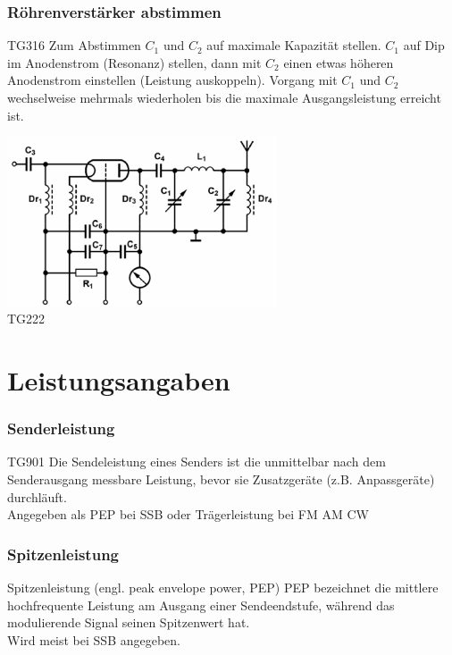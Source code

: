 \begin{frame}
    \frametitle{Röhrenverstärker abstimmen}
    \begin{center} \Large
        \begin{block}{TG316}
		\large
		Zum Abstimmen $C_1$ und $C_2$ auf maximale Kapazität stellen. $C_1$ auf Dip im Anodenstrom (Resonanz) stellen, dann mit $C_2$ einen etwas höheren Anodenstrom einstellen (Leistung auskoppeln). Vorgang mit $C_1$ und $C_2$ wechselweise mehrmals wiederholen bis die maximale Ausgangsleistung erreicht ist.
    	\end{block}
        \includegraphics[width=0.6\textwidth]{a07/TG313.png}\\
        \tiny TG222 \hyperlink{refs}{\cite{bna}}
    \end{center}
\end{frame}

\section*{Leistungsangaben}

\begin{frame}
    \frametitle{Senderleistung}
        \begin{block}{TG901} \Large
			Die Sendeleistung eines Senders ist  die unmittelbar nach dem Senderausgang messbare Leistung, bevor sie Zusatzgeräte (z.B. Anpassgeräte) durchläuft. \\
			Angegeben als PEP bei SSB oder Trägerleistung bei FM AM CW
	    \end{block}
\end{frame}

\begin{frame}
    \frametitle{Spitzenleistung}
        \begin{block}{Spitzenleistung (engl. peak envelope power, PEP)} \Large
			PEP bezeichnet die mittlere hochfrequente Leistung am Ausgang einer Sendeendstufe, während das modulierende Signal seinen Spitzenwert hat.\\
			Wird meist bei SSB angegeben.
	    \end{block}
\end{frame}

